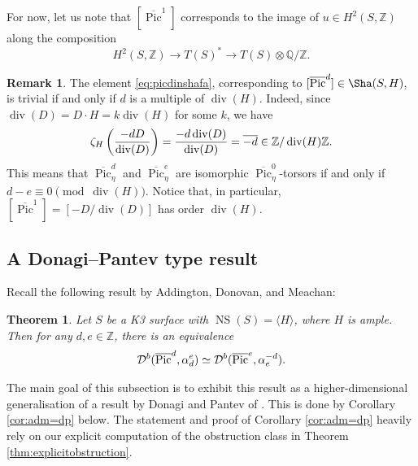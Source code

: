 \documentclass[11pt,twoside]{amsart}
\numberwithin{equation}{section}
\newtheorem{theorem}[dummy]{Theorem}
\theoremstyle{definition}
\newtheorem{remark}[dummy]{Remark}
\theoremstyle{plain}
\newcommand{\Z}{\ensuremath{\mathbb{Z}}}
\newcommand{\Q}{\ensuremath{\mathbb{Q}}}
\def\Db{\calD^{b}}
\def\NS{\operatorname{NS}}
\def\olPic{\overline{\operatorname{Pic}}}
\def\dv{\operatorname{div}}
\begin{document}
For now, let us note that $[\olPic^1]$ corresponds to the image of $u\in H^2(S,\Z)$ along the composition $$H^2(S,\Z)\to T(S)^*\to T(S)\otimes \Q/\Z.$$

\begin{remark}\label{rem:whichdegreesgiveisomorphictorsors}
    The element \eqref{eq:picdinshafa}, corresponding to $[\olPic^d]\in \Sha(S,H)$, is trivial if and only if $d$ is a multiple of $\dv(H)$. Indeed, since $\dv(D)=D\cdot H=k\dv(H)$ for some $k$, we have 
    $$\zeta_H\left(\dfrac{-dD}{\dv(D)}\right)=\dfrac{-d\dv(D)}{\dv(D)}=\overline{-d}\in \bbZ/\dv(H)\bbZ.$$
    This means that $\olPic^d_\eta$ and $\olPic^e_\eta$ are isomorphic $\olPic^0_\eta$-torsors if and only if $d -e\equiv0\pmod{\dv(H)}$. Notice that, in particular, $[\olPic^1]=[-D/\dv(D)]$ has order $\dv(H)$.
\end{remark}

\subsection{A Donagi--Pantev type result}
Recall the following result by Addington, Donovan, and Meachan:
\begin{theorem}\cite{ADM16}\label{thm:ADM}
    Let $S$ be a K3 surface with $\NS(S) = \langle H\rangle$, where $H$ is ample. Then for any $d,e\in \Z$, there is an equivalence $$\Db(\olPic^d,\alpha_d^e)\simeq \Db(\olPic^e,\alpha_e^{-d}).$$
\end{theorem}

The main goal of this subsection is to exhibit this result as a higher-dimensional generalisation of a result by Donagi and Pantev of \cite{DP08}. This is done by Corollary \ref{cor:adm=dp} below. The statement and proof of Corollary \ref{cor:adm=dp} heavily rely on our explicit computation of the obstruction class in Theorem \ref{thm:explicitobstruction}.
\end{document}
